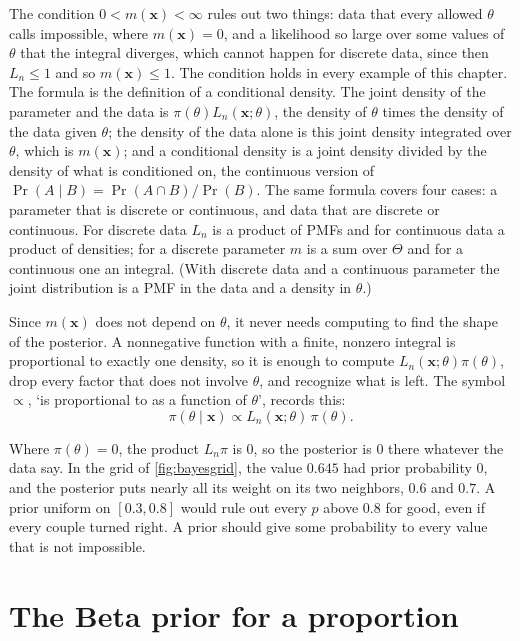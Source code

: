 The condition $0 < m(\mathbf{x}) < \infty$ rules out two things: data that every allowed $\theta$ calls impossible, where $m(\mathbf{x}) = 0$, and a likelihood so large over some values of $\theta$ that the integral diverges, which cannot happen for discrete data, since then $L_n \leq 1$ and so $m(\mathbf{x}) \leq 1$.
The condition holds in every example of this chapter.
The formula is the definition of a conditional density.
The joint density of the parameter and the data is $\pi(\theta)L_n(\mathbf{x}; \theta)$, the density of $\theta$ times the density of the data given $\theta$; the density of the data alone is this joint density integrated over $\theta$, which is $m(\mathbf{x})$; and a conditional density is a joint density divided by the density of what is conditioned on, the continuous version of $\Pr(A \mid B) = \Pr(A \cap B)/\Pr(B)$.
The same formula covers four cases: a parameter that is discrete or continuous, and data that are discrete or continuous.
For discrete data $L_n$ is a product of PMFs and for continuous data a product of densities; for a discrete parameter $m$ is a sum over $\Theta$ and for a continuous one an integral. (With discrete data and a continuous parameter the joint distribution is a PMF in the data and a density in $\theta$.)

Since $m(\mathbf{x})$ does not depend on $\theta$, it never needs computing to find the shape of the posterior.
A nonnegative function with a finite, nonzero integral is proportional to exactly one density, so it is enough to compute $L_n(\mathbf{x}; \theta)\pi(\theta)$, drop every factor that does not involve $\theta$, and recognize what is left.
The symbol $\propto$, `is proportional to as a function of $\theta$', records this:
\[
\pi(\theta \mid \mathbf{x}) \propto L_n(\mathbf{x}; \theta)\,\pi(\theta).
\]

\begin{pitfall}
Where $\pi(\theta) = 0$, the product $L_n\pi$ is $0$, so the posterior is $0$ there whatever the data say.
In the grid of \cref{fig:bayesgrid}, the value $0.645$ had prior probability $0$, and the posterior puts nearly all its weight on its two neighbors, $0.6$ and $0.7$.
A prior uniform on $[0.3, 0.8]$ would rule out every $p$ above $0.8$ for good, even if every couple turned right.
A prior should give some probability to every value that is not impossible.
\end{pitfall}

\section{The Beta prior for a proportion}
\label{sec:bayes-beta}

